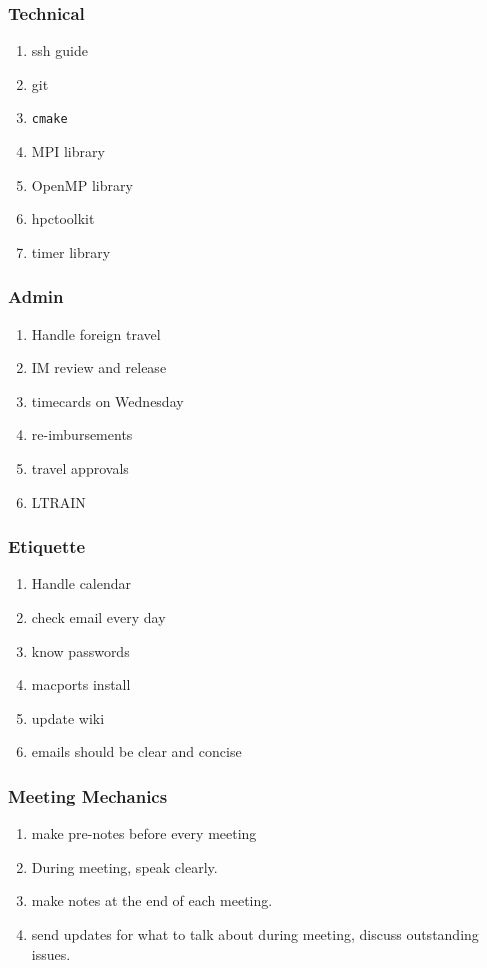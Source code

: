 \begin{frame}
\frametitle{Technical}
\begin{enumerate} 
\item ssh guide
\item git
\item \texttt{cmake}
\item MPI library
\item OpenMP library
\item hpctoolkit
\item timer library
\end{enumerate} 
\end{frame} 

\begin{frame} 
\frametitle{Admin}
\begin{enumerate} 
\item Handle foreign travel
\item IM review and release
\item timecards on Wednesday
\item re-imbursements
\item travel approvals
\item LTRAIN 
\end{enumerate} 
\end{frame} 


\begin{frame} 
\frametitle{Etiquette} 
\begin{enumerate} 
\item Handle calendar
\item check email every day
\item know passwords
\item macports install
\item update wiki 
\item emails should be clear and concise 
\end{enumerate} 
\end{frame}


\begin{frame}
\frametitle{Meeting Mechanics}
\begin{enumerate}
\item make pre-notes before every meeting
\item During meeting, speak clearly. 
\item make notes at the end of each meeting. 
\item send updates for what to talk about during meeting, discuss outstanding issues.  
\end{enumerate} 
\end{frame} 



